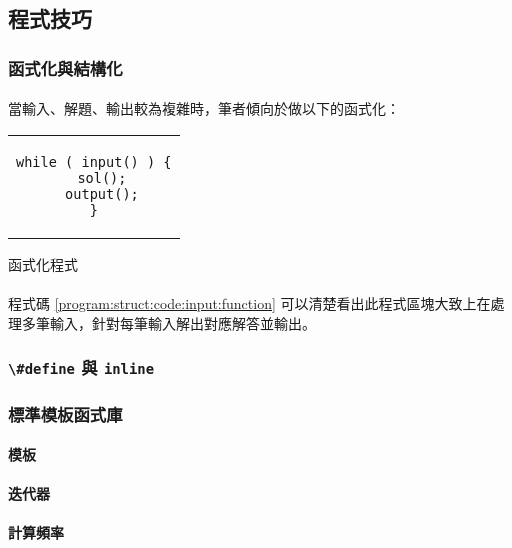 \documentclass[12pt,a4paper,oneside]{article}
\begin{document}
\begin{CJK}{UTF8}{bkai}
\subsection{程式技巧}

\subsubsection{函式化與結構化}

\paragraph{}當輸入、解題、輸出較為複雜時，筆者傾向於做以下的函式化：

\begin{code}[h!]
\centering
\begin{tabular}{c}
\begin{lstlisting}
while ( input() ) {
  sol();
  output();
}
\end{lstlisting}
\end{tabular}
\caption{函式化程式}
\label{program:struct:code:input:function}
\end{code}

\paragraph{}程式碼 \ref{program:struct:code:input:function} 可以清楚看出此程式區塊大致上在處理多筆輸入，針對每筆輸入解出對應解答並輸出。

\subsubsection{\lstinline!\#define! 與 \lstinline!inline!}

\subsubsection{標準模板函式庫}

\paragraph{模板}

\paragraph{迭代器}

\paragraph{計算頻率}


\end{CJK}
\end{document}
